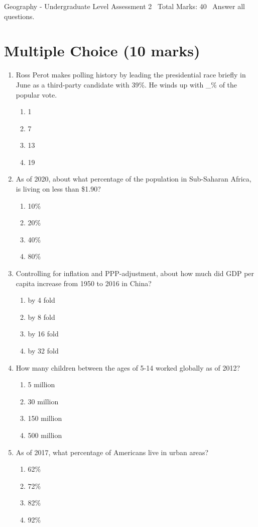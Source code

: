 \documentclass[12pt]{article}
\begin{document}
\begin{center}
Geography - Undergraduate Level Assessment 2 \
Total Marks: 40 \
Answer all questions.
\end{center}

\section*{Multiple Choice (10 marks)}
\begin{enumerate}[label=\arabic*.]
\item Ross Perot makes polling history by leading the presidential race briefly in June as a third-party candidate with 39\%. He winds up with \_\% of the popular vote.
\begin{enumerate}[label=(\alph*)]
    \item 1
    \item 7
    \item 13
    \item 19
\end{enumerate}
\item As of 2020, about what percentage of the population in Sub-Saharan Africa, is living on less than \$1.90?
\begin{enumerate}[label=(\alph*)]
    \item 10\%
    \item 20\%
    \item 40\%
    \item 80\%
\end{enumerate}
\item Controlling for inflation and PPP-adjustment, about how much did GDP per capita increase from 1950 to 2016 in China?
\begin{enumerate}[label=(\alph*)]
    \item by 4 fold
    \item by 8 fold
    \item by 16 fold
    \item by 32 fold
\end{enumerate}
\item How many children between the ages of 5-14 worked globally as of 2012?
\begin{enumerate}[label=(\alph*)]
    \item 5 million
    \item 30 million
    \item 150 million
    \item 500 million
\end{enumerate}
\item As of 2017, what percentage of Americans live in urban areas?
\begin{enumerate}[label=(\alph*)]
    \item 62\%
    \item 72\%
    \item 82\%
    \item 92\%
\end{enumerate}
\end{enumerate}
\end{document}
